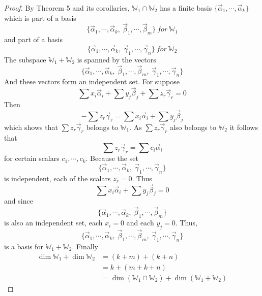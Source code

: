 \documentclass{article}
\begin{document}
    \begin{proof}
        By Theorem 5 and its corollaries, \(\mathbb{W}_1 \cap \mathbb{W}_2\) has a finite 
        basis \(\{\vec{\alpha}_1, \cdots, \vec{\alpha}_k\}\) which is part of a basis 
        \[\{\vec{\alpha}_1, \cdots, \vec{\alpha}_k, \ \vec{\beta}_1, \cdots, \vec{\beta}_m\} \ for \  \mathbb{W}_1\]
        and part of a basis 
        \[\{\vec{\alpha}_1, \cdots, \vec{\alpha}_k, \ \vec{\gamma}_1, \cdots, \vec{\gamma}_n\} \ for \  \mathbb{W}_2\]
        The subspace \(\mathbb{W}_1 + \mathbb{W}_2\) is spanned by the vectors 
        \[\{\vec{\alpha}_1, \cdots, \vec{\alpha}_k, \ \vec{\beta}_1, \cdots, \vec{\beta}_m, \ \vec{\gamma}_1, \cdots, \vec{\gamma}_n\}\]
        And these vectors form an independent set. For suppose
        \begin{equation*}
            \sum{x_i \vec{\alpha}_i} + \sum{y_j \vec{\beta}_j} + \sum{z_r \vec{\gamma}_r} = 0
        \end{equation*}
        Then 
        \begin{equation*}
            - \sum{z_r \vec{\gamma}_r} = \sum{x_i \vec{\alpha}_i} + \sum{y_j \vec{\beta}_j} 
        \end{equation*}
        which shows that \(\sum{z_r \vec{\gamma}_r}\) belongs to \(\mathbb{W}_1\). As \(\sum{z_r \vec{\gamma}_r}\)
        also belongs to \(\mathbb{W}_2\) it follows that 
        \[\sum{z_r \vec{\gamma}_r} = \sum{c_i \vec{\alpha}_i}\]
        for certain scalars \(c_1, \cdots, c_k\). Because the set 
        \[\{\vec{\alpha}_1, \cdots, \vec{\alpha}_k, \ \vec{\gamma}_1, \cdots, \vec{\gamma}_n\}\]
        is independent, each of the scalars \(z_r=0\). Thus
        \[\sum{x_i \vec{\alpha}_i} + \sum{y_j \vec{\beta}_j}=0\]
        and since 
        \[\{\vec{\alpha}_1, \cdots, \vec{\alpha}_k, \ \vec{\beta}_1, \cdots, \vec{\beta}_m\}\]
        is also an independent set, each \(x_i=0\) and each \(y_j=0\). Thus,
        \[\{\vec{\alpha}_1, \cdots, \vec{\alpha}_k, \ \vec{\beta}_1, \cdots, \vec{\beta}_m, \ \vec{\gamma}_1, \cdots, \vec{\gamma}_n\}\]
        is a basis for \(\mathbb{W}_1 + \mathbb{W}_2\). Finally 
        \begin{equation*}
            \begin{split}
                \dim{\mathbb{W}_1} + \dim{\mathbb{W}_2} &= (k+m)+(k+n) \\ 
                                                        &= k + (m + k + n) \\ 
                                                        &= \dim{(\mathbb{W}_1 \cap \mathbb{W}_2)} + \dim{(\mathbb{W}_1 + \mathbb{W}_2)}
            \end{split}
        \end{equation*}
    \end{proof}
\end{document}
